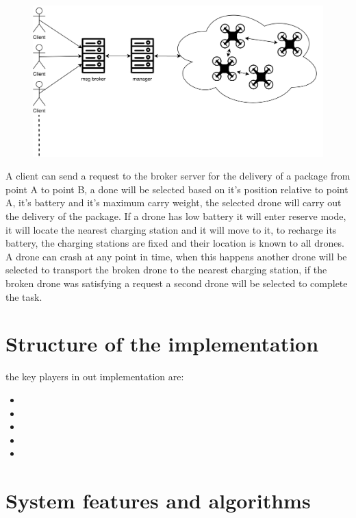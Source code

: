 \documentclass[a4paper, oneside]{memoir}
\begin{document}
\begin{figure}[h!]
	\centering
	\includegraphics[width=\linewidth]{Overview}
\end{figure}

A client can send a request to the broker server for the delivery of a package from point A to point B, a done will be selected based on it's position relative to point A, it's  battery and it's maximum carry weight, the selected drone will carry out the delivery of the package.
If a drone has low battery it will enter reserve mode, it will locate the nearest charging station and it will move to it, to recharge its battery, the charging stations are fixed and their location is known to all drones.\\
A drone can crash at any point in time, when this happens another drone will be selected to transport the broken drone to the nearest charging station, if the broken drone was satisfying a request a second drone will be selected to complete the task.


\section{Structure of the implementation}
the key players in out implementation are:
\begin{itemize}
\item
\item
\item
\item
\item
\end{itemize}
\section{System features and algorithms}
\end{document}
